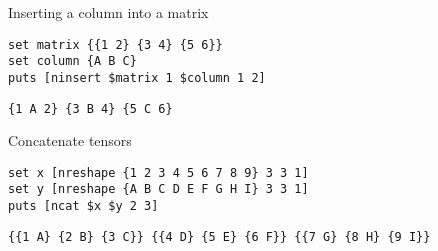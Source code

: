 \begin{example}{Inserting a column into a matrix}
\begin{lstlisting}
set matrix {{1 2} {3 4} {5 6}}
set column {A B C}
puts [ninsert $matrix 1 $column 1 2]
\end{lstlisting}
\tcblower
\begin{lstlisting}
{1 A 2} {3 B 4} {5 C 6}
\end{lstlisting}
\end{example}
\begin{example}{Concatenate tensors}
\begin{lstlisting}
set x [nreshape {1 2 3 4 5 6 7 8 9} 3 3 1]
set y [nreshape {A B C D E F G H I} 3 3 1]
puts [ncat $x $y 2 3]
\end{lstlisting}
\tcblower
\begin{lstlisting}
{{1 A} {2 B} {3 C}} {{4 D} {5 E} {6 F}} {{7 G} {8 H} {9 I}}
\end{lstlisting}
\end{example}

\clearpage
